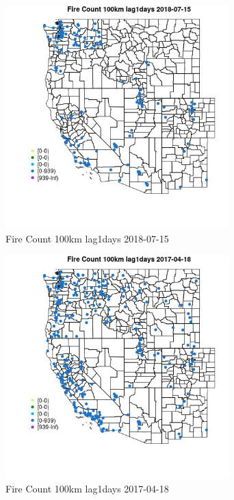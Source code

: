 \begin{figure} 
\centering  
\includegraphics[width=0.77\textwidth]{Code_Outputs/Report_ML_input_PM25_Step4_part_e_de_duplicated_aves_compiled_2019-05-20wNAs_MapObsFire_Count_100km_lag1days2018-07-15.jpg} 
\caption{\label{fig:Report_ML_input_PM25_Step4_part_e_de_duplicated_aves_compiled_2019-05-20wNAsMapObsFire_Count_100km_lag1days2018-07-15}Fire Count 100km lag1days 2018-07-15} 
\end{figure} 
 

\begin{figure} 
\centering  
\includegraphics[width=0.77\textwidth]{Code_Outputs/Report_ML_input_PM25_Step4_part_e_de_duplicated_aves_compiled_2019-05-20wNAs_MapObsFire_Count_100km_lag1days2017-04-18.jpg} 
\caption{\label{fig:Report_ML_input_PM25_Step4_part_e_de_duplicated_aves_compiled_2019-05-20wNAsMapObsFire_Count_100km_lag1days2017-04-18}Fire Count 100km lag1days 2017-04-18} 
\end{figure} 
 

